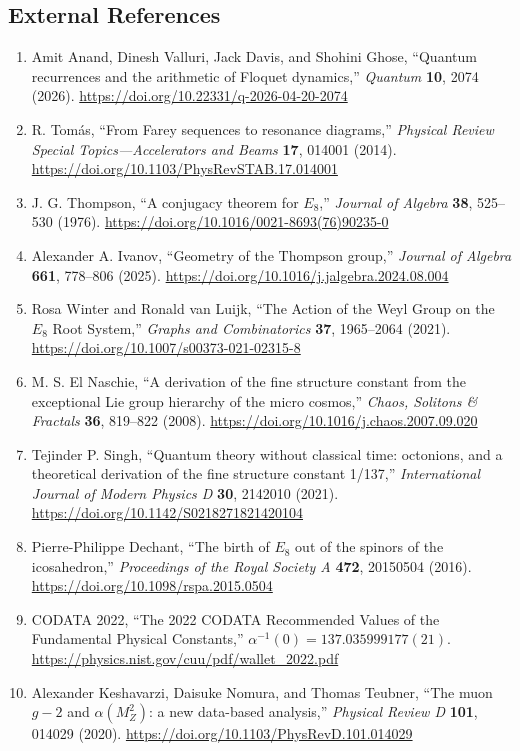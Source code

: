 \documentclass[
  10pt,
  a4paper,
]{article}
\providecommand{\tightlist}{%
  \setlength{\itemsep}{0pt}\setlength{\parskip}{0pt}}
\begin{document}
\subsection{External References}\label{external-references}

\begin{enumerate}
\def\labelenumi{\arabic{enumi}.}
\setcounter{enumi}{4}
\tightlist
\item
  Amit Anand, Dinesh Valluri, Jack Davis, and Shohini Ghose, ``Quantum
  recurrences and the arithmetic of Floquet dynamics,'' \emph{Quantum}
  \textbf{10}, 2074 (2026).
  \url{https://doi.org/10.22331/q-2026-04-20-2074}
\item
  R. Tomás, ``From Farey sequences to resonance diagrams,''
  \emph{Physical Review Special Topics---Accelerators and Beams}
  \textbf{17}, 014001 (2014).
  \url{https://doi.org/10.1103/PhysRevSTAB.17.014001}
\item
  J. G. Thompson, ``A conjugacy theorem for \(E_8\),'' \emph{Journal of
  Algebra} \textbf{38}, 525--530 (1976).
  \url{https://doi.org/10.1016/0021-8693(76)90235-0}
\item
  Alexander A. Ivanov, ``Geometry of the Thompson group,'' \emph{Journal
  of Algebra} \textbf{661}, 778--806 (2025).
  \url{https://doi.org/10.1016/j.jalgebra.2024.08.004}
\item
  Rosa Winter and Ronald van Luijk, ``The Action of the Weyl Group on
  the \(E_8\) Root System,'' \emph{Graphs and Combinatorics}
  \textbf{37}, 1965--2064 (2021).
  \url{https://doi.org/10.1007/s00373-021-02315-8}
\item
  M. S. El Naschie, ``A derivation of the fine structure constant from
  the exceptional Lie group hierarchy of the micro cosmos,''
  \emph{Chaos, Solitons \& Fractals} \textbf{36}, 819--822 (2008).
  \url{https://doi.org/10.1016/j.chaos.2007.09.020}
\item
  Tejinder P. Singh, ``Quantum theory without classical time: octonions,
  and a theoretical derivation of the fine structure constant 1/137,''
  \emph{International Journal of Modern Physics D} \textbf{30}, 2142010
  (2021). \url{https://doi.org/10.1142/S0218271821420104}
\item
  Pierre-Philippe Dechant, ``The birth of \(E_8\) out of the spinors of
  the icosahedron,'' \emph{Proceedings of the Royal Society A}
  \textbf{472}, 20150504 (2016).
  \url{https://doi.org/10.1098/rspa.2015.0504}
\item
  CODATA 2022, ``The 2022 CODATA Recommended Values of the Fundamental
  Physical Constants,'' \(\alpha^{-1}(0)=137.035999177(21)\).
  \url{https://physics.nist.gov/cuu/pdf/wallet_2022.pdf}
\item
  Alexander Keshavarzi, Daisuke Nomura, and Thomas Teubner, ``The muon
  \(g-2\) and \(\alpha(M_Z^2)\): a new data-based analysis,''
  \emph{Physical Review D} \textbf{101}, 014029 (2020).
  \url{https://doi.org/10.1103/PhysRevD.101.014029}
\end{enumerate}
\end{document}
